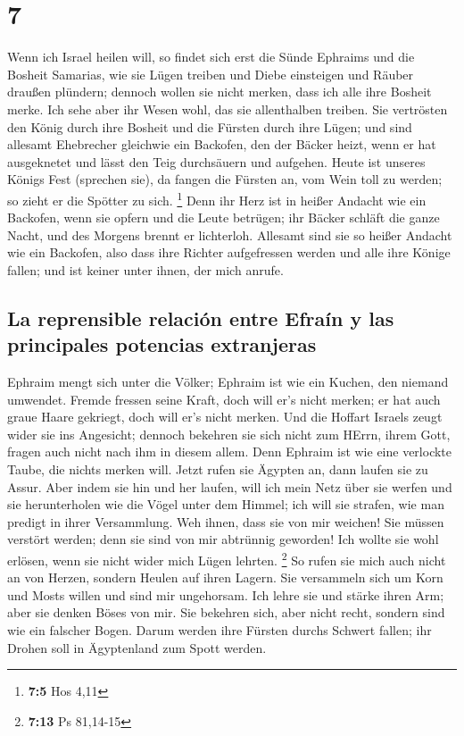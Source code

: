 \hypertarget{section-6}{%
\section{7}\label{section-6}}

 Wenn ich Israel heilen will, so findet sich erst die
Sünde Ephraims und die Bosheit Samarias, wie sie Lügen treiben und Diebe
einsteigen und Räuber draußen plündern;  dennoch wollen
sie nicht merken, dass ich alle ihre Bosheit merke. Ich sehe aber ihr
Wesen wohl, das sie allenthalben treiben.  Sie vertrösten
den König durch ihre Bosheit und die Fürsten durch ihre Lügen;
 und sind allesamt Ehebrecher gleichwie ein Backofen, den
der Bäcker heizt, wenn er hat ausgeknetet und lässt den Teig durchsäuern
und aufgehen.  Heute ist unseres Königs Fest (sprechen
sie), da fangen die Fürsten an, vom Wein toll zu werden; so zieht er die
Spötter zu sich. \footnote{\textbf{7:5} Hos 4,11}  Denn
ihr Herz ist in heißer Andacht wie ein Backofen, wenn sie opfern und die
Leute betrügen; ihr Bäcker schläft die ganze Nacht, und des Morgens
brennt er lichterloh.  Allesamt sind sie so heißer Andacht
wie ein Backofen, also dass ihre Richter aufgefressen werden und alle
ihre Könige fallen; und ist keiner unter ihnen, der mich anrufe.

\hypertarget{la-reprensible-relaciuxf3n-entre-efrauxedn-y-las-principales-potencias-extranjeras}{%
\subsection{La reprensible relación entre Efraín y las principales
potencias
extranjeras}\label{la-reprensible-relaciuxf3n-entre-efrauxedn-y-las-principales-potencias-extranjeras}}

 Ephraim mengt sich unter die Völker; Ephraim ist wie ein
Kuchen, den niemand umwendet.  Fremde fressen seine Kraft,
doch will er's nicht merken; er hat auch graue Haare gekriegt, doch will
er's nicht merken.  Und die Hoffart Israels zeugt wider
sie ins Angesicht; dennoch bekehren sie sich nicht zum HErrn, ihrem
Gott, fragen auch nicht nach ihm in diesem allem.  Denn
Ephraim ist wie eine verlockte Taube, die nichts merken will. Jetzt
rufen sie Ägypten an, dann laufen sie zu Assur.  Aber
indem sie hin und her laufen, will ich mein Netz über sie werfen und sie
herunterholen wie die Vögel unter dem Himmel; ich will sie strafen, wie
man predigt in ihrer Versammlung.  Weh ihnen, dass sie
von mir weichen! Sie müssen verstört werden; denn sie sind von mir
abtrünnig geworden! Ich wollte sie wohl erlösen, wenn sie nicht wider
mich Lügen lehrten. \footnote{\textbf{7:13} Ps 81,14-15} 
So rufen sie mich auch nicht an von Herzen, sondern Heulen auf ihren
Lagern. Sie versammeln sich um Korn und Mosts willen und sind mir
ungehorsam.  Ich lehre sie und stärke ihren Arm; aber sie
denken Böses von mir.  Sie bekehren sich, aber nicht
recht, sondern sind wie ein falscher Bogen. Darum werden ihre Fürsten
durchs Schwert fallen; ihr Drohen soll in Ägyptenland zum Spott werden.

